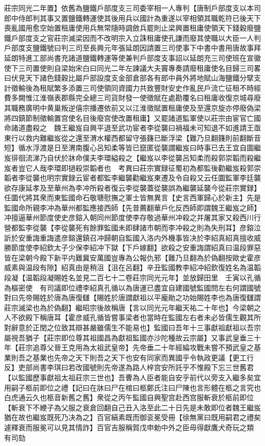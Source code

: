莊宗同光二年置】依舊為鹽鐵戶部度支三司委宰相一人專判【唐制戶部度支以本司郎中侍郎判其事又置鹽鐵轉運使其後用兵以國計為重遂以宰相領其職乾符已後天下喪亂國用愈空始置租庸使用兵無常隨時調斂兵罷則止梁興置租庸使領天下錢穀廢鹽鐵戶部度支之官莊宗滅梁因而不改明宗入立誅租庸使孔謙而廢其使職以大臣一人判戶部度支鹽鐵號曰判三司至長興元年張延朗因請置三司使事下中書中書用唐故事拜延朗特進工部尚書充諸道鹽鐵轉運等使兼判戶部度支事詔以延朗充三司使班在宣徽使下三司置使則自梁始宋白曰同光二年左諫議大夫竇專奏請廢租庸使名目歸三司畧曰伏見天下諸色錢穀比屬戶部設度支金部倉部各有郎中員外將地賦山海鹽鐵分擘支計徵輸後為租賦繁多添置三司使領同資國力共致豐財安史作亂民戶流亡征租不時經費多闕惟江淮嶺表郡縣完全總三司貨財發一使徵賦在處勘覆名曰租庸收復京城尋廢其職務廣明中黄巢叛逆僖宗播遷依前又以江淮徵賦置租庸使及至還京旋亦停廢偽梁將四鎮節制徵輸置宫使名目後廢宫使改置租庸】又罷諸道監軍使以莊宗由宦官亡國命諸道盡殺之　魏王繼岌自興平退至武功宦者李從襲曰禍福未可知退不如進請王亟東行以救内難繼岌從之還至渭水權西都留守張籛已斷浮梁【難乃旦翻籛則前翻斷音短】循水浮渡是日至渭南腹心呂知柔等皆已竄匿從襲謂繼岌曰時事已去王宜自圖繼岌徘徊流涕乃自伏於牀命僕夫李環縊殺之【繼岌以李從襲呂知柔而殺郭崇韜而殺繼岌者豈它人哉李環即撾殺崇韜者也　考異曰莊宗實録征蜀初為都監後勸繼岌殺郭崇韜者李從襲也明宗實録云宦者都監李繼襲勸繼岌東遷及令自殺又云任圜監軍李廷襲欲存康延孝及至華州為李冲所殺者復云李從襲蓋從襲誤為繼襲延襲今從莊宗實録】任圜代將其衆而東監國命石敬瑭慰撫之軍士皆無異言【史言西軍歸心於新主】先是監國命所親李冲為華州都監應接西師【先昔薦翻華戶化反西師即謂魏王繼岌之師】冲擅逼華州節度使史彦鎔入朝同州節度使李存敬過華州冲殺之并屠其家又殺西川行營都監李從襲【李從襲死有餘罪監國未即肆諸市朝而李冲殺之則為失刑耳】彦鎔泣訢於安重誨重誨遣彦鎔還鎮召冲歸朝自監國入洛内外機事皆决於李紹真紹真擅收威勝節度使李紹欽太子少保李紹冲下獄【下戶嫁翻】欲殺之安重誨謂紹真曰温段罪惡皆在梁朝今殿下新平内難冀安萬國豈專為公報仇邪【難乃旦翻為於偽翻按歐史霍彦威素與温段有隙】紹真由是稍沮【沮在呂翻】辛丑監國教李紹冲紹欽復姓名為温韜段凝【温韜段凝賜姓名並見二百七十二卷莊宗同光元年】並放歸田里　壬寅以孔循為樞密使　有司議即位禮李紹真孔循以為唐運已盡宜自建國號監國問左右何謂國號對曰先帝賜姓於唐為唐復讎【賜姓於唐謂獻祖以平龐勛之功始賜姓李也為唐復讎謂莊宗滅梁也為於偽翻】繼昭宗後故稱唐【言以同光元年繼天祐二十年也】今梁朝之人不欲殿下稱唐耳【霍彦威孔循皆嘗事梁者也當時在監國左右者未必皆儒生觀其所對辭意於正閏之位致其辯甚嚴雖儒生不能易也】監國曰吾年十三事獻祖獻祖以吾宗屬視吾猶子【莊宗即位尊其祖國昌為獻祖監國亦沙陀種故云宗屬】又事武皇垂三十年【莊宗追尊父晉王克用為太祖武皇帝】先帝垂二十年經綸攻戰未嘗不預武皇之基業則吾之基業也先帝之天下則吾之天下也安有同家而異國乎令執政更議【更工行反】吏部尚書李琪曰若改國號則先帝遂為路人梓宫安所託乎不惟殿下忘三世舊君【以監國歷事獻祖太祖莊宗三世也】吾曹為人臣者能自安乎前代以旁支入繼多矣宜用嗣子柩前即位之禮【記曰在牀曰尸在棺曰柩鄭氏注曰尸陳也言形體在柩之言究也白虎通云久也柩音新舊之舊】衆從之丙午監國自興聖宫赴西宫服斬衰於柩前即位【斬衰下不緶子為父服之衰倉回翻自己丑入洛至此二十日先是未敢即位者魏王繼岌猶在故也繼岌既死乃决為之】百官縞素既而御衮冕受冊【徐無黨曰既用嗣君之禮矣遽釋衰而服冕可以見其情詐】百官吉服稱賀戊申勅中外之臣毋得獻鷹犬奇玩之類　有司劾

